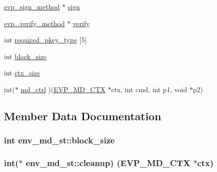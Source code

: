 \begin{DoxyCompactItemize}
\hyperlink{evp_8h_a895f55275cb193151f42c6c9e73f5ace}{evp\+\_\+sign\+\_\+method} $\ast$ \hyperlink{structenv__md__st_a6df1fda17e88ff53073047bede060113}{sign}
\item 
\hyperlink{evp_8h_a91ed9f201836131062a4f24bfe2a1ece}{evp\+\_\+verify\+\_\+method} $\ast$ \hyperlink{structenv__md__st_a887c2442c79f20fd0c47fba0dd100eb2}{verify}
\item 
int \hyperlink{structenv__md__st_a508c2571ca6389b14b054c49ba3fe7b3}{required\+\_\+pkey\+\_\+type} \mbox{[}5\mbox{]}
\item 
int \hyperlink{structenv__md__st_ae76b8152ca0ed7e4442d1210ad4bdf88}{block\+\_\+size}
\item 
int \hyperlink{structenv__md__st_a3c34817fb557d912821c8f06ae5945ba}{ctx\+\_\+size}
\item 
int($\ast$ \hyperlink{structenv__md__st_a0f91a62137d598f55b1e7a321ccbf100}{md\+\_\+ctrl} )(\hyperlink{ossl__typ_8h_a69cda4d21bd068f01c469222c1dd92fe}{E\+V\+P\+\_\+\+M\+D\+\_\+\+C\+TX} $\ast$ctx, int cmd, int p1, void $\ast$p2)
\end{DoxyCompactItemize}


\subsection{Member Data Documentation}
\subsubsection[{\texorpdfstring{block\+\_\+size}{block_size}}]{\setlength{\rightskip}{0pt plus 5cm}int env\+\_\+md\+\_\+st\+::block\+\_\+size}\hypertarget{structenv__md__st_ae76b8152ca0ed7e4442d1210ad4bdf88}{}\label{structenv__md__st_ae76b8152ca0ed7e4442d1210ad4bdf88}
\subsubsection[{\texorpdfstring{cleanup}{cleanup}}]{\setlength{\rightskip}{0pt plus 5cm}int($\ast$ env\+\_\+md\+\_\+st\+::cleanup) ({\bf E\+V\+P\+\_\+\+M\+D\+\_\+\+C\+TX} $\ast$ctx)}\hypertarget{structenv__md__st_acf24becb13e74703b0995ab0f310dc69}{}\label{structenv__md__st_acf24becb13e74703b0995ab0f310dc69}
